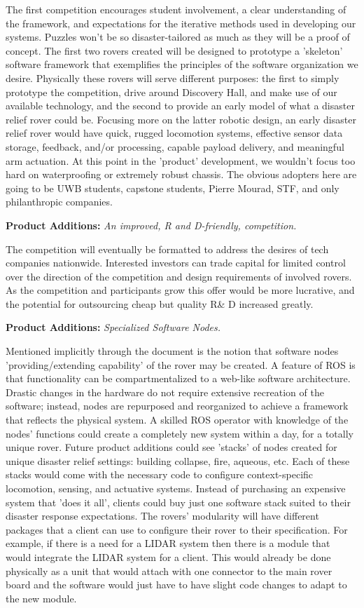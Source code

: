 \documentclass[a4paper, 10pt]{article}
\begin{document}
		The first competition encourages student involvement, a clear understanding of the framework, and expectations for the iterative methods used in developing our systems. Puzzles won't be so disaster-tailored as much as they will be a proof of concept. The first two rovers created will be designed to prototype a 'skeleton' software framework that exemplifies the principles of the software organization we desire. Physically these rovers will serve different purposes: the first to simply prototype the competition, drive around Discovery Hall, and make use of our available technology, and the second to provide an early model of what a disaster relief rover could be. Focusing more on the latter robotic design, an early disaster relief rover would have quick, rugged locomotion systems, effective sensor data storage, feedback, and/or processing, capable payload delivery, and meaningful arm actuation. At this point in the 'product' development, we wouldn't focus too hard on waterproofing or extremely robust chassis. The obvious adopters here are going to be UWB students, capstone students, Pierre Mourad, STF, and only philanthropic companies.
		
		\textbf{Product Additions:} \emph{An improved, R and D-friendly, competition.}

	The competition will eventually be formatted to address the desires of tech companies nationwide. Interested investors can trade capital for limited control over the direction of the competition and design requirements of involved rovers. As the competition and participants grow this offer would be more lucrative, and the potential for outsourcing cheap but quality R\& D increased greatly.

		\textbf{Product Additions:} \emph{Specialized Software Nodes.}
		
	Mentioned implicitly through the document is the notion that software nodes 'providing/extending capability' of the rover may be created. A feature of ROS is that functionality can be compartmentalized to a web-like software architecture. Drastic changes in the hardware do not require extensive recreation of the software; instead, nodes are repurposed and reorganized to achieve a framework that reflects the physical system. A skilled ROS operator with knowledge of the nodes' functions could create a completely new system within a day, for a totally unique rover. Future product additions could see 'stacks' of nodes created for unique disaster relief settings: building collapse, fire, aqueous, etc. Each of these stacks would come with the necessary code to configure context-specific locomotion, sensing, and actuative systems. Instead of purchasing an expensive system that 'does it all', clients could buy just one software stack suited to their disaster response expectations. 
	The rovers' modularity will have different packages that a client can use to configure their rover to their specification. For example, if there is a need for a LIDAR system then there is a module that would integrate the LIDAR system for a client. This would already be done physically as a unit that would attach with one connector to the main rover board and the software would just have to have slight code changes to adapt to the new module. 
\end{document}
